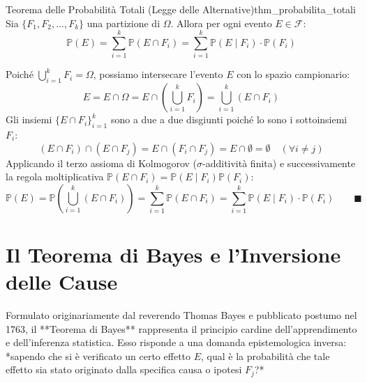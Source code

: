 \begin{teorema}{Teorema delle Probabilità Totali (Legge delle Alternative)}{thm_probabilita_totali}
Sia $\{F_1, F_2, \dots, F_k\}$ una partizione di $\Omega$. Allora per ogni evento $E \in \mathcal{F}$:
\begin{equation}
    \mathbb{P}(E) = \sum_{i=1}^k \mathbb{P}(E \cap F_i) = \sum_{i=1}^k \mathbb{P}(E \mid F_i) \cdot \mathbb{P}(F_i)
\end{equation}
\end{teorema}

\begin{dimostrazione}
Poiché $\bigcup_{i=1}^k F_i = \Omega$, possiamo intersecare l'evento $E$ con lo spazio campionario:
\begin{equation}
    E = E \cap \Omega = E \cap \left( \bigcup_{i=1}^k F_i \right) = \bigcup_{i=1}^k (E \cap F_i)
\end{equation}
Gli insiemi $\{E \cap F_i\}_{i=1}^k$ sono a due a due disgiunti poiché lo sono i sottoinsiemi $F_i$:
\begin{equation}
    (E \cap F_i) \cap (E \cap F_j) = E \cap (F_i \cap F_j) = E \cap \emptyset = \emptyset \quad (\forall i \neq j)
\end{equation}
Applicando il terzo assioma di Kolmogorov ($\sigma$-additività finita) e successivamente la regola moltiplicativa $\mathbb{P}(E \cap F_i) = \mathbb{P}(E \mid F_i)\mathbb{P}(F_i)$:
\begin{equation}
    \mathbb{P}(E) = \mathbb{P}\left( \bigcup_{i=1}^k (E \cap F_i) \right) = \sum_{i=1}^k \mathbb{P}(E \cap F_i) = \sum_{i=1}^k \mathbb{P}(E \mid F_i) \cdot \mathbb{P}(F_i) \qquad \blacksquare
\end{equation}
\end{dimostrazione}

\section{Il Teorema di Bayes e l'Inversione delle Cause}
\label{sec:teorema_bayes}

Formulato originariamente dal reverendo Thomas Bayes e pubblicato postumo nel 1763, il **Teorema di Bayes** rappresenta il principio cardine dell'apprendimento e dell'inferenza statistica. Esso risponde a una domanda epistemologica inversa: *sapendo che si è verificato un certo effetto $E$, qual è la probabilità che tale effetto sia stato originato dalla specifica causa o ipotesi $F_j$?*

